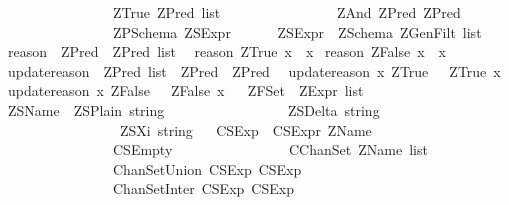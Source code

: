 \begin{isabellebody}
\ \ \ \ \ \ \ \ \ \ \ \ \ \ \ {\isacharbar}\ ZTrue\ {\isachardoublequoteopen}ZPred\ list{\isachardoublequoteclose}\isanewline
\ \ \ \ \ \ \ \ \ \ \ \ \ \ \ {\isacharbar}\ ZAnd\ ZPred\ ZPred\isanewline
\ \ \ \ \ \ \ \ \ \ \ \ \ \ \ {\isacharbar}\ ZPSchema\ ZSExpr\isanewline
{}\ \ \ \ \ \ ZSExpr\ {\isacharequal}\ ZSchema\ {\isachardoublequoteopen}ZGenFilt\ list{\isachardoublequoteclose}\isanewline
\ \isanewline
{}\isamarkupfalse%
\ reason\ {\isacharcolon}{\isacharcolon}\ {\isachardoublequoteopen}ZPred\ {\isasymRightarrow}\ ZPred\ list{\isachardoublequoteclose}\isanewline
{}\isanewline
\ \ {\isachardoublequoteopen}reason\ {\isacharparenleft}ZTrue\ x{\isacharparenright}\ {\isacharequal}\ x{\isachardoublequoteclose}\isanewline
{\isacharbar}\ {\isachardoublequoteopen}reason\ {\isacharparenleft}ZFalse\ x{\isacharparenright}\ {\isacharequal}\ x{\isachardoublequoteclose}\isanewline
\isanewline
\ \isanewline
{}\isamarkupfalse%
\ update{\isacharunderscore}reason\ {\isacharcolon}{\isacharcolon}\ {\isachardoublequoteopen}ZPred\ list\ {\isasymRightarrow}\ ZPred\ {\isasymRightarrow}\ ZPred{\isachardoublequoteclose}\isanewline
{}\isanewline
\ \ {\isachardoublequoteopen}update{\isacharunderscore}reason\ x\ {\isacharparenleft}ZTrue\ {\isacharunderscore}{\isacharparenright}\ {\isacharequal}\ {\isacharparenleft}ZTrue\ x{\isacharparenright}{\isachardoublequoteclose}\isanewline
{\isacharbar}\ {\isachardoublequoteopen}update{\isacharunderscore}reason\ x\ {\isacharparenleft}ZFalse\ {\isacharunderscore}{\isacharparenright}\ {\isacharequal}\ {\isacharparenleft}ZFalse\ x{\isacharparenright}{\isachardoublequoteclose}\isanewline
\isanewline
\ \isanewline
{}\isamarkupfalse%
\ ZFSet\ {\isacharequal}\ {\isachardoublequoteopen}ZExpr\ list{\isachardoublequoteclose}\isanewline
\ \isanewline
{}\isamarkupfalse%
\ ZSName\ {\isacharequal}\ ZSPlain\ string\isanewline
\ \ \ \ \ \ \ \ \ \ \ \ \ \ \ \ {\isacharbar}\ ZSDelta\ string\isanewline
\ \ \ \ \ \ \ \ \ \ \ \ \ \ \ \ {\isacharbar}\ ZSXi\ string\isanewline
\ \isanewline
{}\isamarkupfalse%
\ CSExp\ {\isacharequal}\ CSExpr\ ZName\isanewline
\ \ \ \ \ \ \ \ \ \ \ \ \ \ \ {\isacharbar}\ CSEmpty\isanewline
\ \ \ \ \ \ \ \ \ \ \ \ \ \ \ {\isacharbar}\ CChanSet\ {\isachardoublequoteopen}ZName\ list{\isachardoublequoteclose}\isanewline
\ \ \ \ \ \ \ \ \ \ \ \ \ \ \ {\isacharbar}\ ChanSetUnion\ CSExp\ CSExp\isanewline
\ \ \ \ \ \ \ \ \ \ \ \ \ \ \ {\isacharbar}\ ChanSetInter\ CSExp\ CSExp\isanewline

\end{isabellebody}
